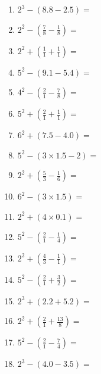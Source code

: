 \documentclass[12pt]{article}
\begin{document}
\begin{enumerate}
\newpage
\item \large $ 2^{3} - (8.8 - 2.5) = $ \vspace{1.4cm}
\item \large $ 2^{2} - (\frac{7}{8} - \frac{1}{8}) = $ \vspace{1.4cm}
\item \large $ 2^{2} + (\frac{1}{1} + \frac{1}{1}) = $ \vspace{1.4cm}
\item \large $ 5^{2} - (9.1 - 5.4) = $ \vspace{1.4cm}
\item \large $ 4^{2} - (\frac{2}{1} - \frac{7}{8}) = $ \vspace{1.4cm}
\item \large $ 5^{2} + (\frac{2}{1} + \frac{1}{1}) = $ \vspace{1.4cm}
\item \large $ 6^{2} + (7.5 - 4.0) = $ \vspace{1.4cm}
\item \large $ 5^{2} - (3 \times 1.5 - 2) = $ \vspace{1.4cm}
\item \large $ 2^{2} + (\frac{5}{3} - \frac{1}{6}) = $ \vspace{1.4cm}
\item \large $ 6^{2} - (3 \times 1.5) = $ \vspace{1.4cm}
\newpage
\item \large $ 2^{2} + (4 \times 0.1) = $ \vspace{1.4cm}
\item \large $ 5^{2} - (\frac{2}{1} - \frac{1}{4}) = $ \vspace{1.4cm}
\item \large $ 2^{2} + (\frac{4}{3} - \frac{1}{1}) = $ \vspace{1.4cm}
\item \large $ 5^{2} - (\frac{2}{1} + \frac{3}{2}) = $ \vspace{1.4cm}
\item \large $ 2^{3} + (2.2 + 5.2) = $ \vspace{1.4cm}
\item \large $ 2^{2} + (\frac{2}{1} + \frac{13}{8}) = $ \vspace{1.4cm}
\item \large $ 5^{2} - (\frac{2}{1} - \frac{7}{4}) = $ \vspace{1.4cm}
\item \large $ 2^{3} - (4.0 - 3.5) = $ \vspace{1.4cm}

\end{enumerate}
\end{document}
